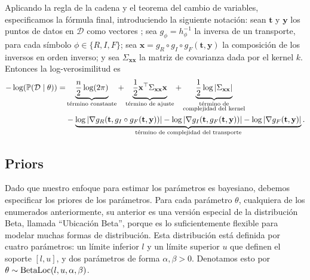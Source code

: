 Aplicando la regla de la cadena y el teorema del cambio de variables, especificamos la fórmula final, introduciendo la siguiente notación: sean \(\mathbf{t}\) y \(\mathbf{y}\) los puntos de datos en \(\mathcal{D}\) como vectores ; sea \(g_\phi = h_\phi^{-1}\) la inversa de un transporte, para cada símbolo \(\phi \in \{R, I, F\}\); sea \(\mathbf{x} = g_R \circ g_I \circ g_F(\mathbf{t}, \mathbf{y})\) la composición de los inversos en orden inverso; y sea \(\Sigma_{\mathbf{xx}}\) la matriz de covarianza dada por el kernel \(k\). Entonces la log-verosimilitud es
\begin{align*}
-\log(\mathbb{P}(\mathcal{D} \mid \theta)) =	& \underbrace{\frac{n}{2} \log(2\pi)}_{\text{término constante}} + \underbrace{\frac{1}{2}\mathbf{x}^\top \Sigma_{\mathbf{xx}} \mathbf{x}}_{\text{término de ajuste}} + \underbrace{\frac{1}{2} \log |\Sigma_{\mathbf{xx}}|}_{\substack{\text{término de}\\ \text{complejidad del kernel}}}\\
& - \underbrace{ \log|\nabla g_R (\mathbf{t}, g_I \circ g_F (\mathbf{t}, \mathbf{y}))| - \log|\nabla g_I (\mathbf{t}, g_F (\mathbf{t}, \mathbf{y}))| - \log|\nabla g_F (\mathbf{t}, \mathbf{y})|}_{\substack{\text{término de complejidad del transporte}}}.
\end{align*}


\subsection{Priors}

Dado que nuestro enfoque para estimar los parámetros es bayesiano, debemos especificar los priores de los parámetros. Para cada parámetro \( \theta \), cualquiera de los enumerados anteriormente, su anterior es una versión especial de la distribución Beta, llamada ``Ubicación Beta'', porque es lo suficientemente flexible para modelar muchas formas de distribución. Esta distribución está definida por cuatro parámetros: un límite inferior \(l\) y un límite superior \(u\) que definen el soporte \( [l, u] \), y dos parámetros de forma \(\alpha, \beta > 0\). Denotamos esto por \( \theta \sim \operatorname{BetaLoc}(l, u, \alpha, \beta)\).

